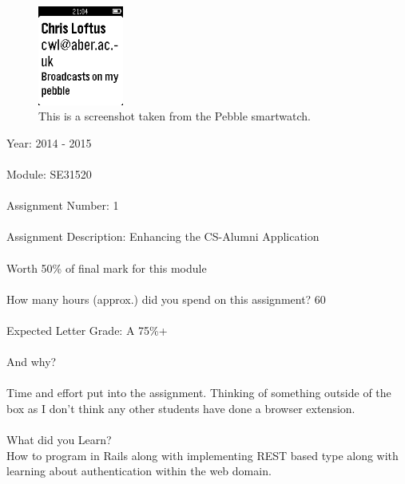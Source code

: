 \documentclass{article}
\begin{document}
\begin{figure}[H]
\centering
\includegraphics[width=0.25\textwidth]{pebblesh}
\caption{This is a screenshot taken from the Pebble smartwatch.}
\end{figure}

\newpage

\nocite{bs:2014:online}
\nocite{bw:2014:online}
\nocite{jq:2014:online}
\nocite{qu:2014:online}
\nocite{mo:2014:online}
\nocite{af:2014:online}
\nocite{bi:2014:online}

\newpage
\printbibheading
\printbibliography[keyword=web,title={Web}]
\printbibliography[keyword=libs,title={Attributions}]

\newpage

Year: 2014 - 2015\\
\\
Module: SE31520\\
\\
Assignment Number: 1\\
\\
Assignment Description: Enhancing the CS-Alumni Application\\
\\
Worth 50\% of final mark for this module\\
\\
How many hours (approx.) did you spend on this assignment? 60\\
\\
Expected Letter Grade: A 75\%+\\
\\
And why?\\
\\
Time and effort put into the assignment. Thinking of something outside of the box as I don't think any other students have done a browser extension.\\
\\
What did you Learn? 
\\
How to program in Rails along with implementing REST based type along with learning about authentication within the web domain.\\
\end{document}
